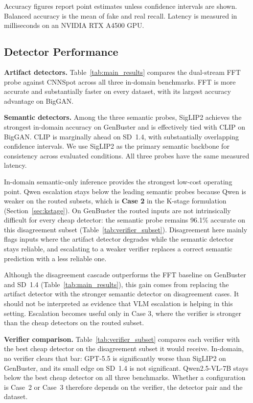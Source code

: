 \documentclass{ieeeaccess}
\begin{document}
Accuracy figures report point estimates unless confidence intervals are shown. Balanced accuracy is the mean of fake and real recall. Latency
is measured in milliseconds on an NVIDIA RTX A4500 GPU.

\subsection{Detector Performance}
\label{sec:detector_performance}

\textbf{Artifact detectors.} Table~\ref{tab:main_results} compares the dual-stream
FFT probe against CNNSpot across all three in-domain benchmarks. FFT is more accurate
and substantially faster on every dataset, with its largest accuracy advantage on
BigGAN.

\textbf{Semantic detectors.} Among the three semantic probes, SigLIP2 achieves the
strongest in-domain accuracy on GenBuster and is effectively tied with CLIP on BigGAN.
CLIP is marginally ahead on SD~1.4, with substantially overlapping confidence intervals.
We use SigLIP2 as the primary semantic backbone for consistency across evaluated
conditions. All three probes have the same measured latency.

In-domain semantic-only inference provides the strongest low-cost operating point. Qwen escalation stays below the leading semantic probes because Qwen is weaker on the routed subsets, which is \textbf{Case 2} in the K-stage formulation (Section~\ref{sec:kstage}). On GenBuster the routed inputs are not intrinsically difficult for every cheap detector: the semantic probe remains 96.1\% accurate on this disagreement subset (Table~\ref{tab:verifier_subset}). Disagreement here mainly flags inputs where the artifact detector degrades while the semantic detector stays reliable, and escalating to a weaker verifier replaces a correct semantic prediction with a less reliable one.

Although the disagreement cascade outperforms the FFT baseline on GenBuster and
SD~1.4 (Table~\ref{tab:main_results}), this gain comes from replacing the
artifact detector with the stronger semantic detector on disagreement cases.
It should not be interpreted as evidence that VLM escalation is helping in this
setting. Escalation becomes useful only in Case 3, where the verifier is stronger
than the cheap detectors on the routed subset.

\textbf{Verifier comparison.} Table~\ref{tab:verifier_subset} compares each verifier with the best cheap detector on the disagreement subset it would receive. In-domain, no verifier clears that bar: GPT-5.5 is significantly worse than SigLIP2 on GenBuster, and its small edge on SD~1.4 is not significant. Qwen2.5-VL-7B stays below the best cheap detector on all three benchmarks. Whether a configuration is Case~2 or Case~3 therefore depends on the verifier, the detector pair and the dataset.
\end{document}
